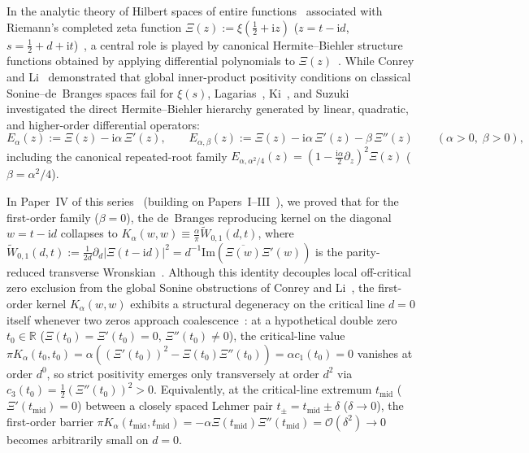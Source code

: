 \documentclass[11pt,reqno]{amsart}
\theoremstyle{definition}
\theoremstyle{remark}
\numberwithin{equation}{section}
\newcommand{\R}{\mathbb{R}}
\newcommand{\ii}{\mathrm{i}}
\newcommand{\Ima}{\mathrm{Im}}
\begin{document}
In the analytic theory of Hilbert spaces of entire functions~\cite{debranges1968,debranges1986,debranges1992} associated with Riemann's completed zeta function $\Xi(z) := \xi(\frac{1}{2} + \ii z)$ ($z = t - \ii d$, $s = \frac{1}{2} + d + \ii t$)~\cite{riemann1859,polya1926,titchmarsh1986}, a central role is played by canonical Hermite--Biehler structure functions obtained by applying differential polynomials to $\Xi(z)$~\cite{lagarias2006,ki2008,suzuki2011}. While Conrey and Li~\cite{conreyli2000} demonstrated that global inner-product positivity conditions on classical Sonine--de~Branges spaces fail for $\xi(s)$, Lagarias~\cite{lagarias1999,lagarias2006}, Ki~\cite{ki2008}, and Suzuki~\cite{suzuki2011} investigated the direct Hermite--Biehler hierarchy generated by linear, quadratic, and higher-order differential operators:
\begin{equation}\label{eq:intro_E_alpha_beta}
E_\alpha(z) := \Xi(z) - \ii\alpha\,\Xi'(z), \qquad E_{\alpha,\beta}(z) := \Xi(z) - \ii\alpha\,\Xi'(z) - \beta\,\Xi''(z) \qquad (\alpha > 0,\; \beta > 0),
\end{equation}
including the canonical repeated-root family $E_{\alpha,\alpha^2/4}(z) = (1 - \frac{\ii\alpha}{2}\partial_z)^2\Xi(z)$ ($\beta = \alpha^2/4$).

In Paper~IV of this series~\cite{missiaen2026paper4} (building on Papers~I--III~\cite{missiaen2026paper1,missiaen2026paper2,missiaen2026paper3}), we proved that for the first-order family ($\beta = 0$), the de~Branges reproducing kernel on the diagonal $w = t - \ii d$ collapses to $K_\alpha(w,w) \equiv \frac{\alpha}{\pi}\widetilde{W}_{0,1}(d,t)$, where $\widetilde{W}_{0,1}(d,t) := \frac{1}{2d}\partial_d|\Xi(t-\ii d)|^2 = d^{-1}\Ima(\overline{\Xi(w)}\Xi'(w))$ is the parity-reduced transverse Wronskian~\cite{speiser1934,hinkkanen1997,csordas1986,griffin2019}. Although this identity decouples local off-critical zero exclusion from the global Sonine obstructions of Conrey and Li~\cite{conreyli2000}, the first-order kernel $K_\alpha(w,w)$ exhibits a structural degeneracy on the critical line $d = 0$ itself whenever two zeros approach coalescence~\cite{lehmer1956}: at a hypothetical double zero $t_0 \in \R$ ($\Xi(t_0) = \Xi'(t_0) = 0$, $\Xi''(t_0) \neq 0$), the critical-line value $\pi K_\alpha(t_0, t_0) = \alpha((\Xi'(t_0))^2 - \Xi(t_0)\Xi''(t_0)) = \alpha c_1(t_0) = 0$ vanishes at order $d^0$, so strict positivity emerges only transversely at order $d^2$ via $c_3(t_0) = \frac{1}{2}(\Xi''(t_0))^2 > 0$. Equivalently, at the critical-line extremum $t_{\mathrm{mid}}$ ($\Xi'(t_{\mathrm{mid}}) = 0$) between a closely spaced Lehmer pair $t_\pm = t_{\mathrm{mid}} \pm \delta$ ($\delta \to 0$), the first-order barrier $\pi K_\alpha(t_{\mathrm{mid}}, t_{\mathrm{mid}}) = -\alpha\Xi(t_{\mathrm{mid}})\Xi''(t_{\mathrm{mid}}) = \mathcal{O}(\delta^2) \to 0$ becomes arbitrarily small on $d = 0$.
\end{document}
